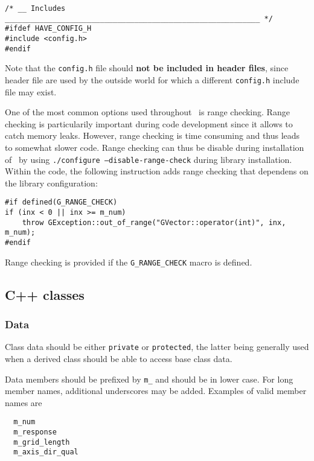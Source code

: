 \documentclass{article}[12pt,a4]
\begin{document}
\begin{verbatim}
/* __ Includes ___________________________________________________________ */
#ifdef HAVE_CONFIG_H
#include <config.h>
#endif
\end{verbatim}

Note that the {\tt config.h} file should {\bf not be included in header files}, since header file
are used by the outside world for which a different {\tt config.h} include file may exist.

One of the most common options used throughout \this\ is range checking.
Range checking is particularily important during code development since it allows to catch
memory leaks.
However, range checking is time consuming and thus leads to somewhat slower code.
Range checking can thus be disable during installation of \this\ by using
{\tt ./configure --disable-range-check} during library installation.
Within the code, the following instruction adds range checking that dependens on
the library configuration:

\begin{verbatim}
#if defined(G_RANGE_CHECK)
if (inx < 0 || inx >= m_num)
    throw GException::out_of_range("GVector::operator(int)", inx, m_num);
#endif
\end{verbatim}

Range checking is provided if the {\tt G\_RANGE\_CHECK} macro is defined.


\subsection{C++ classes}

\subsubsection{Data}

Class data should be either {\tt private} or {\tt protected}, the latter being generally used
when a derived class should be able to access base class data.

Data members should be prefixed by {\tt m\_} and should be in lower case.
For long member names, additional underscores may be added.
Examples of valid member names are
\begin{verbatim}
  m_num
  m_response
  m_grid_length
  m_axis_dir_qual
\end{verbatim}
\end{document}
